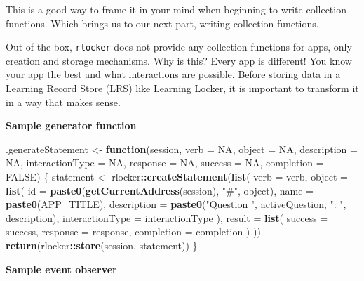 \documentclass[
]{book}
\newenvironment{Shaded}{\begin{snugshade}}{\end{snugshade}}
\newcommand{\ControlFlowTok}[1]{\textcolor[rgb]{0.13,0.29,0.53}{\textbf{#1}}}
\newcommand{\DataTypeTok}[1]{\textcolor[rgb]{0.13,0.29,0.53}{#1}}
\newcommand{\KeywordTok}[1]{\textcolor[rgb]{0.13,0.29,0.53}{\textbf{#1}}}
\newcommand{\NormalTok}[1]{#1}
\newcommand{\OperatorTok}[1]{\textcolor[rgb]{0.81,0.36,0.00}{\textbf{#1}}}
\newcommand{\OtherTok}[1]{\textcolor[rgb]{0.56,0.35,0.01}{#1}}
\newcommand{\StringTok}[1]{\textcolor[rgb]{0.31,0.60,0.02}{#1}}
\begin{document}
This is a good way to frame it in your mind when beginning to write collection functions. Which brings us to our next part, writing collection functions.

Out of the box, \texttt{rlocker} does not provide any collection functions for apps, only creation and storage mechanisms. Why is this? Every app is different! You know your app the best and what interactions are possible. Before storing data in a Learning Record Store (LRS) like \href{https://www.ht2labs.com/learning-locker-community/overview/}{Learning Locker}, it is important to transform it in a way that makes sense.

\textbf{Sample generator function}

\begin{Shaded}
\begin{Highlighting}[]
\NormalTok{.generateStatement <-}\StringTok{ }\ControlFlowTok{function}\NormalTok{(session, }\DataTypeTok{verb =} \OtherTok{NA}\NormalTok{, }\DataTypeTok{object =} \OtherTok{NA}\NormalTok{, }\DataTypeTok{description =} \OtherTok{NA}\NormalTok{, }\DataTypeTok{interactionType =} \OtherTok{NA}\NormalTok{, }\DataTypeTok{response =} \OtherTok{NA}\NormalTok{, }\DataTypeTok{success =} \OtherTok{NA}\NormalTok{, }\DataTypeTok{completion =} \OtherTok{FALSE}\NormalTok{) \{}
\NormalTok{  statement <-}\StringTok{ }\NormalTok{rlocker}\OperatorTok{::}\KeywordTok{createStatement}\NormalTok{(}\KeywordTok{list}\NormalTok{(}
    \DataTypeTok{verb =}\NormalTok{ verb,}
    \DataTypeTok{object =} \KeywordTok{list}\NormalTok{(}
      \DataTypeTok{id =} \KeywordTok{paste0}\NormalTok{(}\KeywordTok{getCurrentAddress}\NormalTok{(session), }\StringTok{"#"}\NormalTok{, object),}
      \DataTypeTok{name =} \KeywordTok{paste0}\NormalTok{(APP_TITLE),}
      \DataTypeTok{description =} \KeywordTok{paste0}\NormalTok{(}\StringTok{"Question "}\NormalTok{, activeQuestion, }\StringTok{": "}\NormalTok{, description),}
      \DataTypeTok{interactionType =}\NormalTok{ interactionType}
\NormalTok{    ),}
    \DataTypeTok{result =} \KeywordTok{list}\NormalTok{(}
      \DataTypeTok{success =}\NormalTok{ success,}
      \DataTypeTok{response =}\NormalTok{ response,}
      \DataTypeTok{completion =}\NormalTok{ completion}
\NormalTok{    )}
\NormalTok{  ))}
  \KeywordTok{return}\NormalTok{(rlocker}\OperatorTok{::}\KeywordTok{store}\NormalTok{(session, statement))   }
\NormalTok{\}}
\end{Highlighting}
\end{Shaded}

\textbf{Sample event observer}
\end{document}
